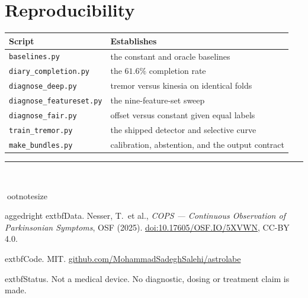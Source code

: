\documentclass[11pt,a4paper]{article}
\begin{document}
\section{Reproducibility}

\begin{center}\small\color{ink}
\begin{tabular}{ll}
\toprule
\textbf{Script} & \textbf{Establishes} \\
\midrule
\texttt{baselines.py} & the constant and oracle baselines \\
\texttt{diary\_completion.py} & the $61.6\%$ completion rate \\
\texttt{diagnose\_deep.py} & tremor versus kinesia on identical folds \\
\texttt{diagnose\_featureset.py} & the nine-feature-set sweep \\
\texttt{diagnose\_fair.py} & offset versus constant given equal labels \\
\texttt{train\_tremor.py} & the shipped detector and selective curve \\
\texttt{make\_bundles.py} & calibration, abstention, and the output contract \\
\bottomrule
\end{tabular}
\end{center}

\vspace{0.5em}
\noindent\textcolor{axis}{\rule{\textwidth}{0.6pt}}\\[0.3em]
{ootnotesize\color{ink2}
\setlength{\parskip}{2pt}

aggedright
	extbf{Data.} Nesser, T.\ et al.,
\emph{COPS --- Continuous Observation of Parkinsonian Symptoms}, OSF (2025).
\href{https://doi.org/10.17605/OSF.IO/5XVWN}{doi:10.17605/OSF.IO/5XVWN}, CC-BY 4.0.

	extbf{Code.} MIT.
\href{https://github.com/MohammadSadeghSalehi/astrolabe}{github.com/MohammadSadeghSalehi/astrolabe}

	extbf{Status.} Not a medical device. No diagnostic, dosing or treatment claim
is made.
}
\end{document}
